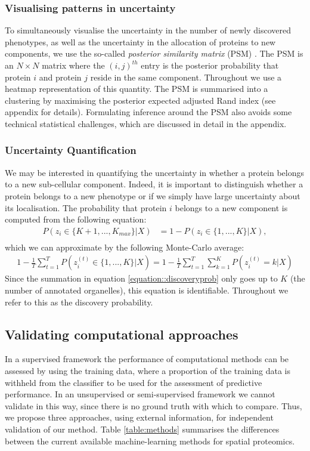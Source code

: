 \documentclass[12pt,english]{article}
\begin{document}
\subsubsection{Visualising patterns in uncertainty}
To simultaneously visualise the uncertainty in the number of newly discovered phenotypes, as well as the uncertainty in the allocation of proteins to new components, we use the so-called \textit{posterior similarity matrix} (PSM) \citep{fritsch::2009}. The PSM is an $N\times N$ matrix where the $(i,j)^{th}$ entry is the posterior probability that protein $i$ and protein $j$ reside in the same component. Throughout we use a heatmap representation of this quantity. The PSM is summarised into a clustering by maximising the posterior expected adjusted Rand index (see appendix for details)\citep{fritsch::2009}. Formulating inference around the PSM also avoids some technical statistical challenges, which are discussed in detail in the appendix.

\subsubsection{Uncertainty Quantification}
We may be interested in quantifying the uncertainty in whether a protein belongs to a new sub-cellular component. Indeed, it is important to distinguish whether a protein belongs to a new phenotype or if we simply have large uncertainty about its localisation. The probability that protein $i$ belongs to a new component is computed from the following equation:
\begin{align}
P(z_i \in \{K + 1,..., K_{max}\}|X) & = 1 - P(z_i \in \{1,..., K\}|X), \\ 
\end{align}
which we can approximate by the following Monte-Carlo average:
\begin{align}\label{equation::discoveryprob}
1 - \frac{1}{T} \sum_{t = 1}^{T}P(z^{(t)}_i \in \{1,..., K\}|X)= 1 - \frac{1}{T} \sum_{t = 1}^{T} \sum_{k=1}^KP(z^{(t)}_i = k|X)
\end{align}
Since the summation in equation \ref{equation::discoveryprob} only goes up to $K$ (the number of annotated organelles), this equation is identifiable. Throughout we refer to this as the discovery probability.
\subsection{Validating computational approaches}
In a supervised framework the performance of computational methods can be assessed by 
using the training data, where a proportion of the training data is withheld from the classifier to be used for the assessment of predictive performance. In an unsupervised or semi-supervised framework we cannot validate in this way, since there is no ground truth with which to compare. Thus, we propose three approaches, using external information, for independent validation of our method. Table \ref{table:methods} summarises the differences between the current available machine-learning methods for spatial proteomics.
\end{document}
